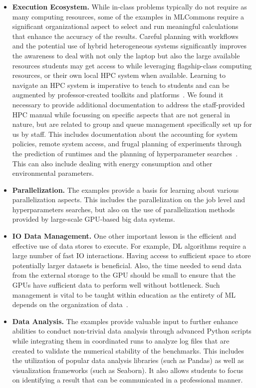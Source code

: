 \documentclass[utf8]{FrontiersinVancouver} %
\begin{document}
\begin{itemize}
\item {\bf Execution Ecosystem.} While in-class problems typically do not require as many computing resources, some of the examples in MLCommons require a significant organizational aspect to select and run meaningful calculations that enhance the accuracy of the results. Careful planning with workflows and the potential use of hybrid heterogeneous systems significantly improves the awareness to deal with not only the laptop but also the large available resources students may get access to while leveraging flagship-class computing resources, or their own local HPC system when available. Learning to navigate an HPC system is imperative to teach to students and can be augmented by professor-created toolkits and platforms~\cite{zou}. We found it necessary to provide additional documentation to address the staff-provided HPC manual while focussing on specific aspects that are not general in nature, but are related to group and queue management specifically set up for us by staff. This includes documentation about the accounting for system policies, remote system access, and frugal planning of experiments through the prediction of runtimes and the planning of hyperparameter searches~\cite{las-22-arxiv-workflow-cc,claesen}. This can also include dealing with energy consumption and other environmental parameters.

\item {\bf Parallelization.} The examples provide a basis for learning about various parallelization aspects. This includes the parallelization on the job level and hyperparameters searches, but also on the use of parallelization methods provided by large-scale GPU-based big data systems.

\item {\bf IO Data Management.} One other important lesson is the efficient and effective use of data stores to execute. For example, DL algorithms require a large number of fast IO interactions. Having access to sufficient space to store potentially larger datasets is beneficial. Also, the time needed to send data from the external storage to the GPU should be small to ensure that the GPUs have sufficient data to perform well without bottleneck. Such management is vital to be taught within education as the entirety of ML depends on the organization of data~\cite{shapiro}.

\item {\bf Data Analysis.} The examples provide valuable input to further enhance abilities to conduct non-trivial data analysis through advanced Python scripts while integrating them in coordinated runs to analyze log files that are created to validate the numerical stability of the benchmarks. This includes the utilization of popular data analysis libraries (such as Pandas) as well as visualization frameworks (such as Seaborn). It also allows students to focus on identifying a result that can be communicated in a professional manner.


\end{itemize}
\end{document}

